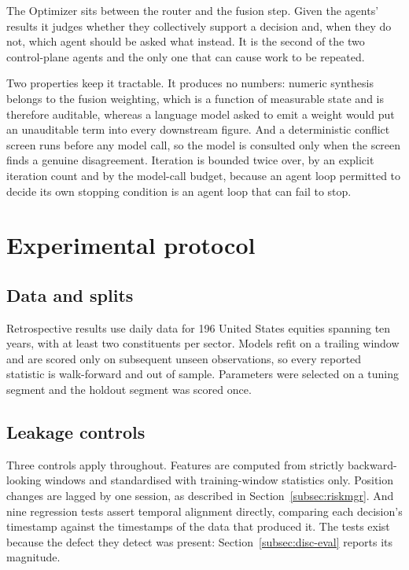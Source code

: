 \documentclass[pdflatex,sn-apa]{sn-jnl}%
\theoremstyle{thmstyleone}%
\theoremstyle{thmstyletwo}%
\theoremstyle{thmstylethree}%
\begin{document}
The Optimizer sits between the router and the fusion step. Given the agents'
results it judges whether they collectively support a decision and, when they do
not, which agent should be asked what instead. It is the second of the two
control-plane agents and the only one that can cause work to be repeated.

Two properties keep it tractable. It produces no numbers: numeric synthesis
belongs to the fusion weighting, which is a function of measurable state and is
therefore auditable, whereas a language model asked to emit a weight would put
an unauditable term into every downstream figure. And a deterministic conflict
screen runs before any model call, so the model is consulted only when the
screen finds a genuine disagreement. Iteration is bounded twice over, by an
explicit iteration count and by the model-call budget, because an agent loop
permitted to decide its own stopping condition is an agent loop that can fail
to stop.

\section{Experimental protocol}\label{sec:protocol}

\subsection{Data and splits}\label{subsec:protocol-data}

Retrospective results use daily data for 196 United States equities spanning
ten years, with at least two constituents per sector. Models refit on a
trailing window and are scored only on subsequent unseen observations, so every
reported statistic is walk-forward and out of sample. Parameters were selected
on a tuning segment and the holdout segment was scored once.

\subsection{Leakage controls}\label{subsec:protocol-leakage}

Three controls apply throughout. Features are computed from strictly
backward-looking windows and standardised with training-window statistics only.
Position changes are lagged by one session, as described in
Section~\ref{subsec:riskmgr}. And nine regression tests assert temporal
alignment directly, comparing each decision's timestamp against the timestamps
of the data that produced it. The tests exist because the defect they detect
was present: Section~\ref{subsec:disc-eval} reports its magnitude.
\end{document}
